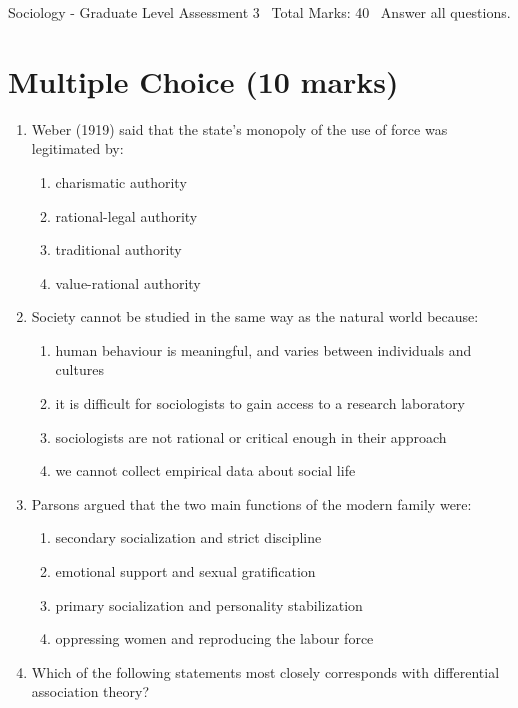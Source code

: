 \documentclass[12pt]{article}
\begin{document}
\begin{center}
Sociology - Graduate Level Assessment 3 \
Total Marks: 40 \
Answer all questions.
\end{center}

\section*{Multiple Choice (10 marks)}
\begin{enumerate}[label=\arabic*.]
\item Weber (1919) said that the state's monopoly of the use of force was legitimated by:
\begin{enumerate}[label=(\alph*)]
    \item charismatic authority
    \item rational-legal authority
    \item traditional authority
    \item value-rational authority
\end{enumerate}
\item Society cannot be studied in the same way as the natural world because:
\begin{enumerate}[label=(\alph*)]
    \item human behaviour is meaningful, and varies between individuals and cultures
    \item it is difficult for sociologists to gain access to a research laboratory
    \item sociologists are not rational or critical enough in their approach
    \item we cannot collect empirical data about social life
\end{enumerate}
\item Parsons argued that the two main functions of the modern family were:
\begin{enumerate}[label=(\alph*)]
    \item secondary socialization and strict discipline
    \item emotional support and sexual gratification
    \item primary socialization and personality stabilization
    \item oppressing women and reproducing the labour force
\end{enumerate}
\item Which of the following statements most closely corresponds with differential association theory?
\begin{enumerate}[label=(\alph*)]

\end{enumerate}
\end{enumerate}
\end{document}
